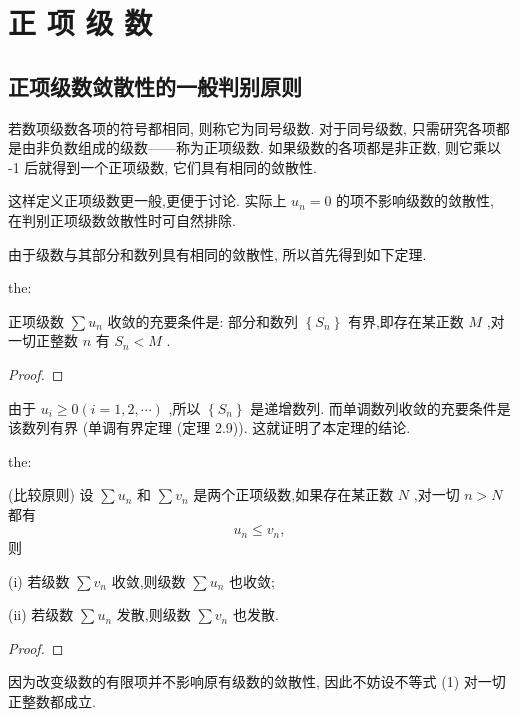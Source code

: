 \section{正 项 级 数}

\subsection{正项级数敛散性的一般判别原则}

若数项级数各项的符号都相同, 则称它为同号级数. 对于同号级数, 只需研究各项都是由非负数组成的级数——称为正项级数. 如果级数的各项都是非正数, 则它乘以 -1 后就得到一个正项级数, 它们具有相同的敛散性.

\begin{remark}

\end{remark}
这样定义正项级数更一般,更便于讨论. 实际上 \({u}_{n} = 0\) 的项不影响级数的敛散性, 在判别正项级数敛散性时可自然排除.

由于级数与其部分和数列具有相同的敛散性, 所以首先得到如下定理.

\begin{theorem}{}{the:}

\end{theorem}
 正项级数 \(\sum {u}_{n}\) 收敛的充要条件是: 部分和数列 \(\left\{  {S}_{n}\right\}\) 有界,即存在某正数 \(M\) ,对一切正整数 \(n\) 有 \({S}_{n} < M\) .

\begin{proof}

\end{proof}
由于 \({u}_{i} \geq  0\left( {i = 1,2,\cdots }\right)\) ,所以 \(\left\{  {S}_{n}\right\}\) 是递增数列. 而单调数列收敛的充要条件是该数列有界 (单调有界定理 (定理 2.9)). 这就证明了本定理的结论.

\begin{theorem}{}{the:}

\end{theorem}
 (比较原则) 设 \(\sum {u}_{n}\) 和 \(\sum {v}_{n}\) 是两个正项级数,如果存在某正数 \(N\) ,对一切 \(n > N\) 都有
\[
{u}_{n} \leq  {v}_{n}, \tag{1}
\]
则

(i) 若级数 \(\sum {v}_{n}\) 收敛,则级数 \(\sum {u}_{n}\) 也收敛;

(ii) 若级数 \(\sum {u}_{n}\) 发散,则级数 \(\sum {v}_{n}\) 也发散.

\begin{proof}

\end{proof}
因为改变级数的有限项并不影响原有级数的敛散性, 因此不妨设不等式 (1) 对一切正整数都成立.

